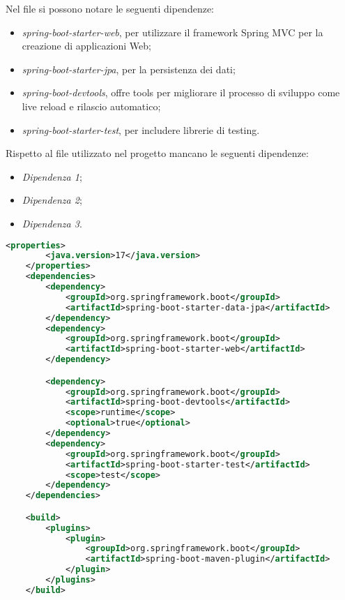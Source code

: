 \noindent Nel file si possono notare le seguenti dipendenze:
\begin{itemize}
\item \textit{spring-boot-starter-web}, per utilizzare il framework Spring MVC per la creazione di applicazioni Web;
\item \textit{spring-boot-starter-jpa}, per la persistenza dei dati;
\item \textit{spring-boot-devtools}, offre tools per migliorare il processo di sviluppo come live reload e rilascio automatico;
\item \textit{spring-boot-starter-test}, per includere librerie di testing.
\end{itemize}
Rispetto al file utilizzato nel progetto mancano le seguenti dipendenze:
\begin{itemize}
\item \textit{Dipendenza 1};
\item \textit{Dipendenza 2};
\item \textit{Dipendenza 3}.
\end{itemize}

\begin{lstlisting}[language=XML,caption = pom.xml con dipendenze selezionate]
	<properties>
		<java.version>17</java.version>
	</properties>
	<dependencies>
		<dependency>
			<groupId>org.springframework.boot</groupId>
			<artifactId>spring-boot-starter-data-jpa</artifactId>
		</dependency>
		<dependency>
			<groupId>org.springframework.boot</groupId>
			<artifactId>spring-boot-starter-web</artifactId>
		</dependency>

		<dependency>
			<groupId>org.springframework.boot</groupId>
			<artifactId>spring-boot-devtools</artifactId>
			<scope>runtime</scope>
			<optional>true</optional>
		</dependency>
		<dependency>
			<groupId>org.springframework.boot</groupId>
			<artifactId>spring-boot-starter-test</artifactId>
			<scope>test</scope>
		</dependency>
	</dependencies>

	<build>
		<plugins>
			<plugin>
				<groupId>org.springframework.boot</groupId>
				<artifactId>spring-boot-maven-plugin</artifactId>
			</plugin>
		</plugins>
	</build>

\end{lstlisting}

